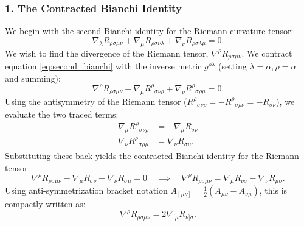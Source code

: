 \documentclass[11pt, a4paper]{report}
\begin{document}
\subsubsection*{1. The Contracted Bianchi Identity}
We begin with the second Bianchi identity for the Riemann curvature tensor:
\begin{equation}
\label{eq:second_bianchi}
\nabla_{\lambda} R_{\rho\sigma\mu\nu} + \nabla_{\mu} R_{\rho\sigma\nu\lambda} + \nabla_{\nu} R_{\rho\sigma\lambda\mu} = 0.
\end{equation}
We wish to find the divergence of the Riemann tensor, $\nabla^{\rho} R_{\rho\sigma\mu\nu}$. We contract equation \eqref{eq:second_bianchi} with the inverse metric $g^{\rho\lambda}$ (setting $\lambda = \alpha, \rho = \alpha$ and summing):
\begin{equation}
\nabla^{\rho} R_{\rho\sigma\mu\nu} + \nabla_{\mu} {R^{\rho}}_{\sigma\nu\rho} + \nabla_{\nu} {R^{\rho}}_{\sigma\rho\mu} = 0.
\end{equation}
Using the antisymmetry of the Riemann tensor (${R^{\rho}}_{\sigma\nu\rho} = -{R^{\rho}}_{\sigma\rho\nu} = -R_{\sigma\nu}$), we evaluate the two traced terms:
\begin{align}
\nabla_{\mu} {R^{\rho}}_{\sigma\nu\rho} &= -\nabla_{\mu} R_{\sigma\nu} \\
\nabla_{\nu} {R^{\rho}}_{\sigma\rho\mu} &= \nabla_{\nu} R_{\sigma\mu}.
\end{align}
Substituting these back yields the contracted Bianchi identity for the Riemann tensor:
\begin{equation}
\label{eq:riemann_divergence}
\nabla^{\rho} R_{\rho\sigma\mu\nu} - \nabla_{\mu} R_{\sigma\nu} + \nabla_{\nu} R_{\sigma\mu} = 0 \quad \implies \quad \nabla^{\rho} R_{\rho\sigma\mu\nu} = \nabla_{\mu} R_{\nu\sigma} - \nabla_{\nu} R_{\mu\sigma}.
\end{equation}
Using anti-symmetrization bracket notation $A_{[\mu\nu]} = \frac{1}{2}(A_{\mu\nu} - A_{\nu\mu})$, this is compactly written as:
\begin{equation}
\nabla^{\rho} R_{\rho\sigma\mu\nu} = 2\nabla_{[\mu} R_{\nu]\sigma}.
\end{equation}
\end{document}
